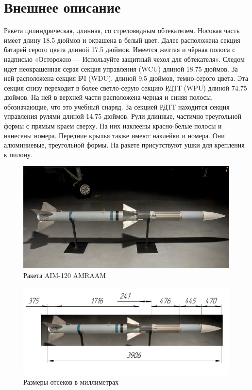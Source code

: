 \documentclass[a4paper,12pt]{report}
\begin{document}
\newpage
\section{Внешнее описание}
Ракета цилиндрическая, длинная, со стреловидным обтекателем.
Носовая часть имеет длину 18.5 дюймов и окрашена в белый цвет. Далее расположена секция батарей серого цвета длиной 17.5 дюймов. Имеется желтая и чёрная полоса с надписью «Осторожно — Используйте защитный чехол для обтекателя».
Следом идет неокрашенная серая секция управления (WCU) длиной 18.75 дюймов. За ней расположена секция БЧ (WDU), длиной 9.5 дюймов, темно-серого цвета.
Эта секция снизу переходит в более светло-серую секцию РДТТ (WPU) длиной 74.75 дюймов. На ней в верхней части расположена черная и синяя полосы, обозначающие, что это учебный снаряд.
За секцией РДТТ находится секция управления рулями длиной 14.75 дюймов. Рули длинные, частично треугольной формы с прямым краем сверху. На них наклеены красно-белые полосы и нанесены номера.
Передние крылья также имеют наклейки и номера. Они алюминиевые, треугольной формы. На ракете присутствуют ушки для крепления к пилону.


\begin{figure}[h!]
\centering
\includegraphics[width=0.55\textheight]{images/2.jpg}
\caption{Ракета AIM-120 AMRAAM}
\label{AIM-120}
\end{figure}

\begin{figure}[h!]
\centering
\includegraphics[width=0.6\textheight]{images/3.jpg}
\caption{Размеры отсеков в миллиметрах}
\label{AIM-120}
\end{figure}
\end{document}
